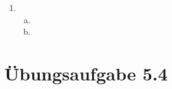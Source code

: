 \documentclass[a4paper]{scrartcl}
\begin{document}
\begin{enumerate}
\begin{enumerate}[(a)]
            \item
                
        \end{enumerate}

    \item
        \begin{enumerate}[(a)]
            \item
                
            \item
                
        \end{enumerate}

\end{enumerate}

\section*{Übungsaufgabe 5.4}
\end{document}
